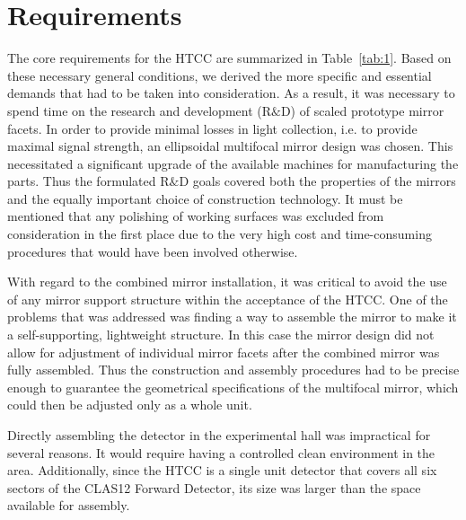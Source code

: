 \section{Requirements}

The core requirements for the HTCC are summarized in Table~\ref{tab:1}. Based on these necessary general
conditions, we derived the more specific and essential demands that had to be taken into consideration. As a
result, it was necessary to spend time on the research and development (R$\&$D) of scaled prototype mirror
facets. In order to provide minimal losses in light collection, i.e. to provide maximal signal strength, an ellipsoidal
multifocal mirror design was chosen. This necessitated a significant upgrade of the available machines for
manufacturing the parts. Thus the formulated R$\&$D goals covered both the properties of the mirrors and
the equally important choice of construction technology. It must be mentioned that any polishing of working
surfaces was excluded from consideration in the first place due to the very high cost and time-consuming
procedures that would have been involved otherwise.

With regard to the combined mirror installation, it was critical to avoid the use of any mirror support structure
within the acceptance of the HTCC. One of the problems that was addressed was finding a way to assemble the
mirror to make it a self-supporting, lightweight structure. In this case the mirror design did not allow for
adjustment of individual mirror facets after the combined mirror was fully assembled. Thus the construction and
assembly procedures had to be precise enough to guarantee the geometrical specifications of the multifocal
mirror, which could then be adjusted only as a whole unit.

Directly assembling the detector in the experimental hall was impractical for several reasons. It would require
having a controlled clean environment in the area. Additionally, since the HTCC is a single unit detector that
covers all six sectors of the CLAS12 Forward Detector, its size was larger than the space available for
assembly.
 
